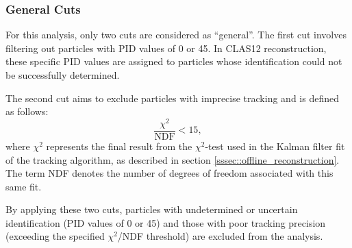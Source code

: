 \subsubsection{General Cuts}
\label{sssec::general_cuts}
    For this analysis, only two cuts are considered as ``general''.
    The first cut involves filtering out particles with PID values of 0 or 45.
    In CLAS12 reconstruction, these specific PID values are assigned to particles whose identification could not be successfully determined.

    The second cut aims to exclude particles with imprecise tracking and is defined as follows:
    \begin{equation*}
        \frac{\chi^2}{\text{NDF}} < 15,
    \end{equation*}
    where $\chi^2$ represents the final result from the $\chi^2$-test used in the Kalman filter fit of the tracking algorithm, as described in section \ref{sssec::offline_reconstruction}.
    The term NDF denotes the number of degrees of freedom associated with this same fit.

    By applying these two cuts, particles with undetermined or uncertain identification (PID values of 0 or 45) and those with poor tracking precision (exceeding the specified $\chi^2$/NDF threshold) are excluded from the analysis.
